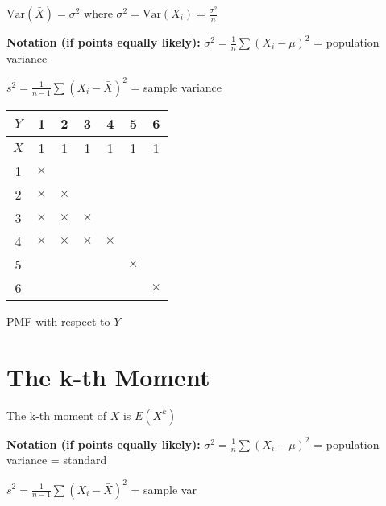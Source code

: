 $\text{Var}(\bar{X}) = \sigma^2$ where $\sigma^2 = \text{Var}(X_i) = \frac{\sigma^2}{n}$

\textbf{Notation (if points equally likely):} $\sigma^2 = \frac{1}{n} \sum (X_i - \mu)^2$ = population variance

$s^2 = \frac{1}{n-1} \sum (X_i - \bar{X})^2$ = sample variance

\begin{center}
\begin{tabular}{c|cccccc}
$Y$ & 1 & 2 & 3 & 4 & 5 & 6 \\
\hline
$X$ & 1 & 1 & 1 & 1 & 1 & 1 \\
1 & $\times$ & & & & & \\
2 & $\times$ & $\times$ & & & & \\
3 & $\times$ & $\times$ & $\times$ & & & \\
4 & $\times$ & $\times$ & $\times$ & $\times$ & & \\
5 & & & & & $\times$ & \\
6 & & & & & & $\times$
\end{tabular}
\end{center}

PMF with respect to $Y$

\section{The k-th Moment}

\begin{definition}
The k-th moment of $X$ is $E(X^k)$
\end{definition}

\textbf{Notation (if points equally likely):} $\sigma^2 = \frac{1}{n} \sum (X_i - \mu)^2$ = population variance = standard

$s^2 = \frac{1}{n-1} \sum (X_i - \bar{X})^2$ = sample var
